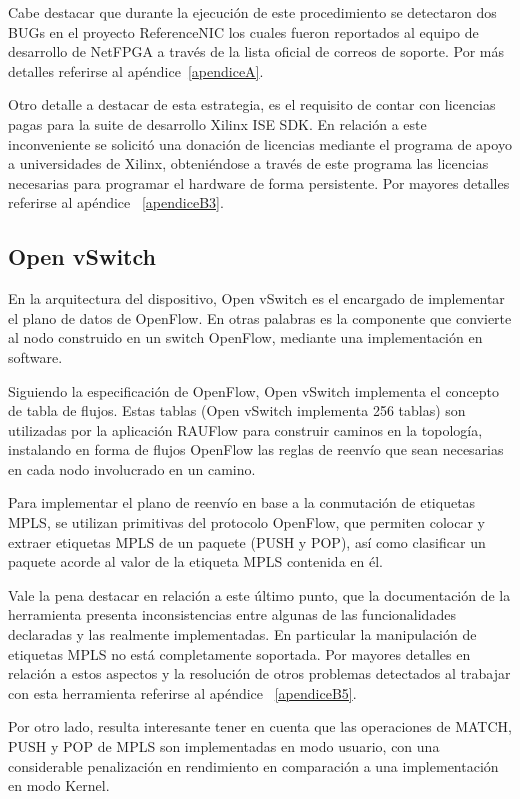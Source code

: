 Cabe destacar que durante la ejecuci\'on de este procedimiento se detectaron dos BUGs en el proyecto ReferenceNIC los cuales fueron reportados al equipo de desarrollo de NetFPGA a través de la lista oficial de correos de soporte. Por m\'as detalles referirse al ap\'endice~\ref{apendiceA}.

Otro detalle a destacar de esta estrategia, es el requisito de contar con licencias pagas para la suite de desarrollo Xilinx ISE SDK. En relaci\'on a este inconveniente se solicit\'o una donaci\'on de licencias mediante el programa de apoyo a universidades de Xilinx, obteniéndose a trav\'es de este programa las licencias necesarias para programar el hardware de forma persistente. Por mayores detalles referirse al ap\'endice ~\ref{apendiceB3}.

\subsection{Open vSwitch}
En la arquitectura del dispositivo, Open vSwitch es el encargado de implementar el plano de datos de OpenFlow. En otras palabras es la componente que convierte al nodo construido en un switch OpenFlow, mediante una implementaci\'on en software.

Siguiendo la especificaci\'on de OpenFlow, Open vSwitch implementa el concepto de tabla de flujos. Estas tablas (Open vSwitch implementa 256 tablas) son utilizadas por la aplicaci\'on RAUFlow para construir caminos en la topolog\'ia, instalando en forma de flujos OpenFlow las reglas de reenvío que sean necesarias en cada nodo involucrado en un camino.

Para implementar el plano de reenvío en base a la conmutaci\'on de etiquetas MPLS, se utilizan primitivas del protocolo OpenFlow, que permiten colocar y extraer etiquetas MPLS de un paquete (PUSH y POP), así como clasificar un paquete acorde al valor de la etiqueta MPLS contenida en \'el.

Vale la pena destacar en relaci\'on a este \'ultimo punto, que la documentaci\'on de la herramienta presenta inconsistencias entre algunas de las funcionalidades declaradas y las realmente implementadas. En particular la manipulaci\'on de etiquetas MPLS no est\'a completamente soportada. Por mayores detalles en relaci\'on a estos aspectos y la resoluci\'on de otros problemas detectados al trabajar con esta herramienta referirse al ap\'endice ~\ref{apendiceB5}.
 
Por otro lado, resulta interesante tener en cuenta que las operaciones de MATCH, PUSH y POP de MPLS son implementadas en modo usuario, con una considerable penalizaci\'on en rendimiento en comparaci\'on a una implementaci\'on en modo Kernel.

